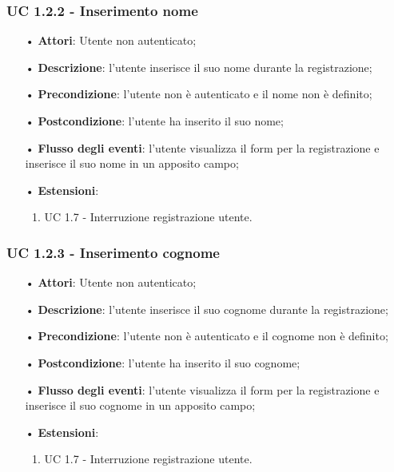 \subsubsection{UC 1.2.2 - Inserimento nome}
\begin{itemize}
\item[•]\textbf{Attori}: Utente non autenticato;
\item[•]\textbf{Descrizione}: l'utente inserisce il suo nome durante la registrazione;
\item[•]\textbf{Precondizione}: l'utente non è autenticato e il nome non è definito;
\item[•]\textbf{Postcondizione}: l'utente ha inserito il suo nome;
\item[•]\textbf{Flusso degli eventi}: l'utente visualizza il form per la registrazione e inserisce il suo nome in un apposito campo;
	\item[•]\textbf{Estensioni}:
	\begin{enumerate}
		\item UC 1.7 - Interruzione registrazione utente.
	\end{enumerate}
\end{itemize}

\subsubsection{UC 1.2.3 - Inserimento cognome}
\begin{itemize}
	\item[•]\textbf{Attori}: Utente non autenticato;
	\item[•]\textbf{Descrizione}: l'utente inserisce il suo cognome durante la registrazione;
	\item[•]\textbf{Precondizione}: l'utente non è autenticato e il cognome non è definito;
	\item[•]\textbf{Postcondizione}: l'utente ha inserito il suo cognome;
	\item[•]\textbf{Flusso degli eventi}: l'utente visualizza il form per la registrazione e inserisce il suo cognome in un apposito campo;
	\item[•]\textbf{Estensioni}:
	\begin{enumerate}
		\item UC 1.7 - Interruzione registrazione utente.
	\end{enumerate}
\end{itemize}


